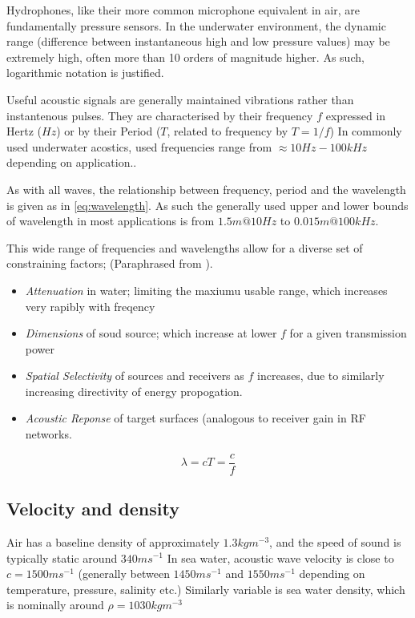 Hydrophones, like their more common microphone equivalent in air, are fundamentally pressure sensors.
In the underwater environment, the dynamic range (difference between instantaneous high and low pressure values) may be extremely high, often more than 10 orders of magnitude higher. 
As such, logarithmic notation is justified.

Useful acoustic signals are generally maintained vibrations rather than instantenous pulses.
They are characterised by their frequency $f$ expressed in Hertz ($Hz$) or by their Period ($T$, related to frequency by $T=1/f$)
In commonly used underwater acostics, used frequencies range from $\approx 10Hz-100kHz$ depending on application.\cite{Stojanovic2007}.

As with all waves, the relationship between frequency, period and the wavelength is given as in \eqref{eq:wavelength}. 
As such the generally used upper and lower bounds of wavelength in most applications is from $1.5 m @ 10Hz$ to $0.015m @ 100kHz$.

This wide range of frequencies and wavelengths allow for a diverse set of constraining factors; (Paraphrased from \cite{lurton2010}).

\begin{itemize}
  \item \emph{Attenuation} in water; limiting the maxiumu usable range, which increases very rapibly with freqency
  \item \emph{Dimensions} of soud source; which increase at lower $f$ for a given transmission power
  \item \emph{Spatial Selectivity} of sources and receivers as $f$ increases, due to similarly increasing directivity of energy propogation.
  \item \emph{Acoustic Reponse} of target surfaces (analogous to receiver gain in RF networks.
\end{itemize}

\begin{equation}
  \lambda = cT = \frac{c}{f}
  \label{eq:wavelength}
\end{equation}


\subsection{Velocity and density}

Air has a baseline density of approximately $1.3 kg m^{-3}$, and the speed of sound is typically static around $340 ms^{-1}$ 
In sea water, acoustic wave velocity is close to $c=1500ms^{-1}$ (generally between $1450ms^{-1}$ and $1550ms^{-1}$ depending on temperature, pressure, salinity etc.)
Similarly variable is sea water density, which is nominally around $\rho = 1030kg m^{-3}$

